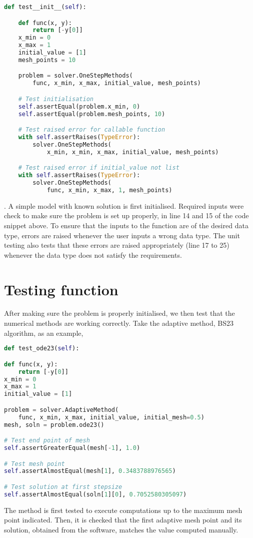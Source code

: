 \begin{lstlisting}[language=Python]
def test__init__(self):

    def func(x, y):
        return [-y[0]]
    x_min = 0
    x_max = 1
    initial_value = [1]
    mesh_points = 10

    problem = solver.OneStepMethods(
        func, x_min, x_max, initial_value, mesh_points)

    # Test initialisation
    self.assertEqual(problem.x_min, 0)
    self.assertEqual(problem.mesh_points, 10)

    # Test raised error for callable function
    with self.assertRaises(TypeError):
        solver.OneStepMethods(
            x_min, x_min, x_max, initial_value, mesh_points)

    # Test raised error if initial_value not list
    with self.assertRaises(TypeError):
        solver.OneStepMethods(
            func, x_min, x_max, 1, mesh_points)
\end{lstlisting}
. A simple model with known solution is first initialised. Required inputs were check to make sure the problem is set up properly, in line 14 and 15 of the code snippet above. To ensure that the inputs to the function are of the desired data type, errors are raised whenever the user inputs a wrong data type. The unit testing also tests that these errors are raised appropriately (line 17 to 25) whenever the data type does not satisfy the requirements. 

\section{Testing function}
After making sure the problem is properly initialised, we then test that the numerical methods are working correctly. Take the adaptive method, BS23 algorithm, as an example, 
\begin{lstlisting}[language=Python]
def test_ode23(self):

def func(x, y):
    return [-y[0]]
x_min = 0
x_max = 1
initial_value = [1]

problem = solver.AdaptiveMethod(
    func, x_min, x_max, initial_value, initial_mesh=0.5)
mesh, soln = problem.ode23()

# Test end point of mesh
self.assertGreaterEqual(mesh[-1], 1.0)

# Test mesh point
self.assertAlmostEqual(mesh[1], 0.3483788976565)

# Test solution at first stepsize
self.assertAlmostEqual(soln[1][0], 0.7052580305097)
\end{lstlisting}
The method is first tested to execute computations up to the maximum mesh point indicated. Then, it is checked that the first adaptive mesh point and its solution, obtained from the software, matches the value computed manually. 